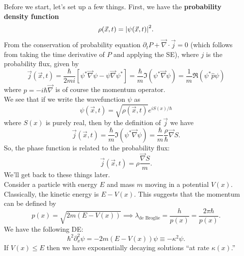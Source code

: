 \documentclass{book}
\theoremstyle{definition}
\newcommand{\p}{\partial}
\newcommand{\f}[2]{\frac{#1}{#2}}
\newcommand{\lp}{\left(}
\newcommand{\rp}{\right)}
\newcommand{\lb}{\left[}
\newcommand{\rb}{\right]}
\begin{document}
Before we start, let's set up a few things. First, we have the \textbf{probability density function}
\begin{equation*}
\rho(\vec{x},t) = \abs{\psi (\vec{x},t)}^2.
\end{equation*} 
From the conservation of probability equation $\p_t P + \vec{\nabla}\cdot \vec{j} = 0$ (which follows from taking the time derivative of $P$ and applying the SE), where $j$ is the probability flux, given by 
\begin{equation*}
\vec{j}(\vec{x},t) = \f{\hbar}{2mi}\lb \psi^* \vec{\nabla} \psi - \psi \vec{\nabla} \psi^* \rb = \f{\hbar}{m} \Im \lp \psi^* \vec{\nabla} \psi \rp = \f{1}{m} \Re\lp \psi^* \widehat{p} \psi \rp
\end{equation*}
where $\widehat{p} = -i\hbar \vec{\nabla}$ is of course the momentum operator. \\



We see that if we write the wavefunction $\psi$ as
\begin{equation*}
\psi(\vec{x},t) = \sqrt{\rho(\vec{x},t)} e^{iS(x)/\hbar}
\end{equation*}  
where $S(x)$ is purely real, then by the definition of $\vec{j}$ we have
\begin{equation*}
\vec{j}(\vec{x},t) = \f{\hbar}{m} \Im\lp \psi^* \vec{\nabla} \psi\rp = \f{\hbar}{m} \f{\rho}{\hbar} \vec{\nabla}S. 
\end{equation*}
So, the phase function is related to the probability flux:
\begin{equation*}
\vec{j}(\vec{x},t) = \rho \f{\vec{\nabla}S }{m}.
\end{equation*}
We'll get back to these things later. \\



Consider a particle with energy $E$ and mass $m$ moving in a potential $V(x)$. Classically, the kinetic energy is $E - V(x)$. This suggests that the momentum can be defined by 
\begin{equation*}
p(x) = \sqrt{2m(E-V(x))} \implies \lambda_{\text{de Broglie}} = \f{h}{p(x)} = \f{2\pi \hbar}{p(x)}.
\end{equation*} 
We have the following DE:
\begin{equation*}
\hbar^2 \p_x^2 \psi = -2m(E-V(x)) \psi \equiv -\kappa^2 \psi. 
\end{equation*}
If $V(x) \leq E$ then we have exponentially decaying solutions ``at rate $\kappa(x)$.'' \\
\end{document}
